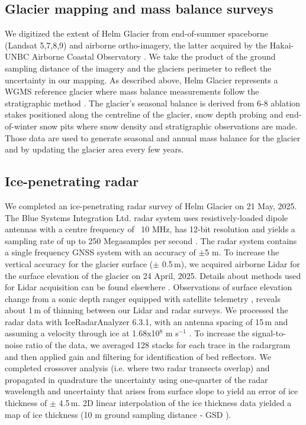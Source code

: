 \documentclass[annals,review,oneside]{igs}
\begin{document}
\subsection{Glacier mapping and mass balance surveys}

We digitized the extent of Helm Glacier from end-of-summer spaceborne (Landsat 5,7,8,9) and airborne ortho-imagery, the latter acquired by the Hakai-UNBC Airborne Coastal Observatory \citep{Donahue2023}. We take the product of the ground sampling distance of the imagery and the glaciers perimeter to reflect the uncertainty in our mapping. As described above, Helm Glacier represents a WGMS reference glacier where mass balance measurements follow the stratigraphic method \citep{Kaser2003}. The glacier's seasonal balance is derived from 6-8 ablation stakes positioned along the centreline of the glacier, snow depth probing and end-of-winter snow pits where snow density and stratigraphic observations are made. Those data are used to generate seasonal and annual mass balance for the glacier and by updating the glacier area every few years. 

\subsection{Ice-penetrating radar}

We completed an ice-penetrating radar survey of Helm Glacier on 21 May, 2025. The Blue Systems Integration Ltd. radar system uses resistively-loaded dipole antennas with a centre frequency of ~10 MHz, has 12-bit resolution and yields a sampling rate of up to 250 Megasamples per second \citep{Mingo2010}. The radar system contains a single frequency GNSS system with an accuracy of $\pm$5 m. To increase the vertical accuracy for the glacier surface ($\pm$ 0.5\,m), we acquired airborne Lidar for the surface elevation of the glacier on 24 April, 2025. Details about methods used for Lidar acquisition can be found elsewhere \citep{Menounos2025}.  Observations of surface elevation change from a sonic depth ranger equipped with satellite telemetry \cite{Bevington2025a}, reveals about 1\,m of thinning between our Lidar and radar surveys. We processed the radar data with IceRadarAnalyzer 6.3.1, with an antenna spacing of 15\,m and assuming a velocity through ice at 1.68x10$^{8}$ m s$^{-1}$ \citep{Reynolds2011}. To increase the signal-to-noise ratio of the data, we averaged 128 stacks for each trace in the radargram and then applied gain and filtering for identification of bed reflectors. We completed crossover analysis (i.e. where two radar transects overlap) and propagated in quadrature  the uncertainty using one-quarter of the radar wavelength \cite{Reynolds2011} and uncertainty that arises from surface slope to yield an error of ice thickness of $\pm$ 4.5\,m.  2D linear interpolation of the ice thickness data yielded a map of ice thickness (10 m ground sampling distance - GSD ).  
\end{document}
